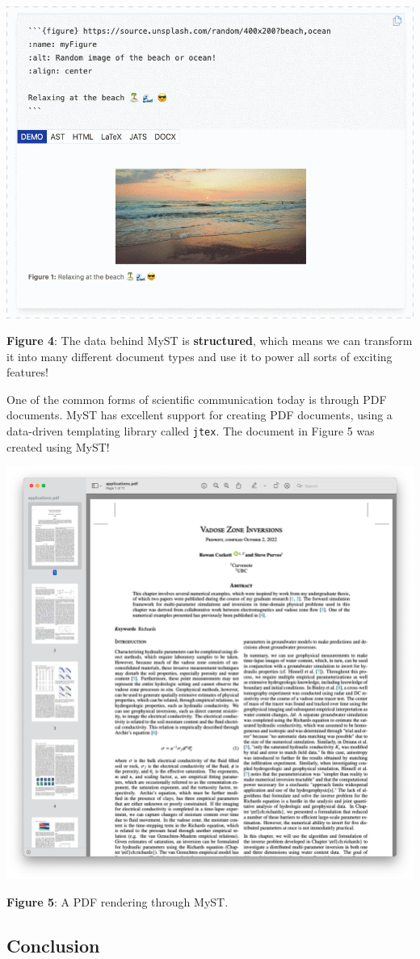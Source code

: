 \documentclass{article}
\begin{document}
\includegraphics[width=0.7\linewidth]{files/structured-data-3fb4d80f05297279d52cac07cf34e65e.png}


\textbf{Figure 4}: The data behind MyST is \textbf{structured}, which means we can transform it into many different document types and use it to power all sorts of exciting features!

One of the common forms of scientific communication today is through PDF documents. MyST has excellent support for creating PDF documents, using a data-driven templating library called \texttt{jtex}. The document in Figure 5 was created using MyST!

\includegraphics[width=0.7\linewidth]{files/pdf-two-column-f91a6c7c58563320a11a31070a8c0337.png}


\textbf{Figure 5}: A PDF rendering through MyST.

\subsection{Conclusion}\label{Conclusion}
\end{document}
